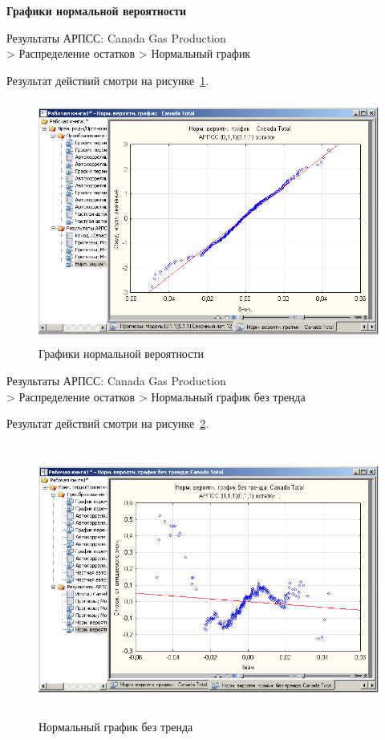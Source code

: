 \begin{center}
  \textbf{Графики нормальной вероятности}
\end{center}

Результаты АРПСС: Canada Gas Production\\
> Распределение остатков
> Нормальный график

Результат действий смотри на рисунке~\ref{fig:2_17}.

\begin{figure}[!h]
  \centering

  \includegraphics[height=8cm]
  {inc/Canada_Gas_Production/17.PNG}

  \caption{Графики нормальной вероятности}

  \label{fig:2_17}
\end{figure}


\newpage

Результаты АРПСС: Canada Gas Production\\
> Распределение остатков
> Нормальный график без тренда

Результат действий смотри на рисунке~\ref{fig:2_18}.

\begin{figure}[!h]
  \centering

  \includegraphics[height=9cm]
  {inc/Canada_Gas_Production/18.PNG}

  \caption{Нормальный график без тренда}

  \label{fig:2_18}
\end{figure}

